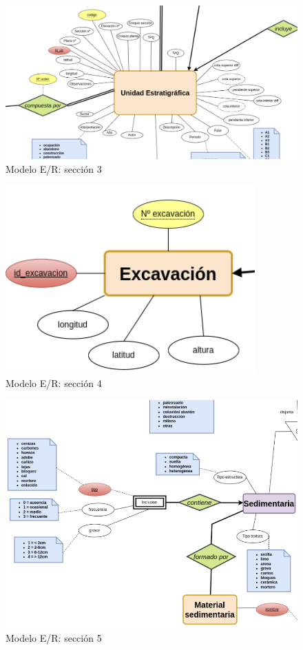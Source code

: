         \begin{figure}[H]
            \centering
            \includegraphics[scale=0.32]{imagenes/E-R3.png}
            \caption{Modelo E/R: sección 3}
            \label{fig:e-rmodel3}
        \end{figure}

        \begin{figure}[H]
            \centering
            \includegraphics{imagenes/E-R4.png}
            \caption{Modelo E/R: sección 4}
            \label{fig:e-rmodel4}
        \end{figure}

        \begin{figure}[H]
            \centering
            \includegraphics[scale=0.35]{imagenes/E-R5.png}
            \caption{Modelo E/R: sección 5}
            \label{fig:e-rmodel5}
        \end{figure}

